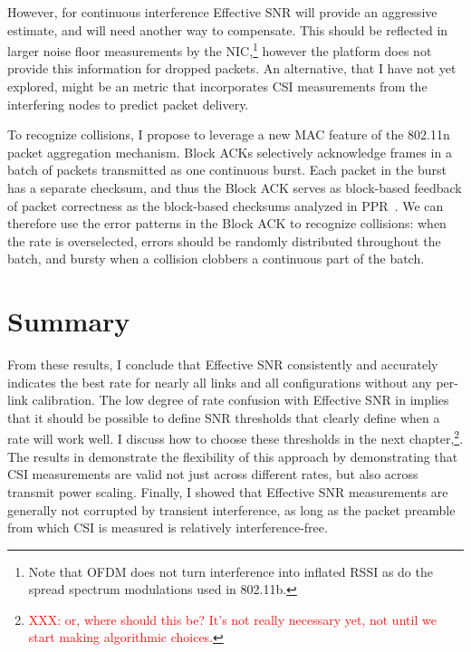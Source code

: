 However, for continuous interference Effective SNR will provide an aggressive estimate, and will need another way to compensate. This should be reflected in larger noise floor measurements by the NIC,\footnote{Note that OFDM does not turn interference into inflated RSSI as do the spread spectrum modulations used in 802.11b.} however the platform does not provide this information for dropped packets. An alternative, that I have not yet explored, might be an  metric that incorporates CSI measurements from the interfering nodes to predict packet delivery.


To recognize collisions, I propose to leverage a new MAC feature of the 802.11n packet aggregation mechanism. Block ACKs selectively acknowledge frames in a batch of packets transmitted as one continuous burst. Each packet in the burst has a separate checksum, and thus the Block ACK serves as block-based feedback of packet correctness as the block-based checksums analyzed in PPR~\cite{Jamieson_PPR}. We can therefore use the error patterns in the Block ACK to recognize collisions: when the rate is overselected, errors should be randomly distributed throughout the batch, and bursty when a collision clobbers a continuous part of the batch.

\section{Summary}
From these results, I conclude that Effective SNR consistently and accurately indicates the best rate for nearly all links and all configurations without any per-link calibration. The low degree of rate confusion with Effective SNR in  implies that it should be possible to define SNR thresholds that clearly define when a rate will work well. I discuss how to choose these thresholds in the next chapter,\footnote{\textcolor{red}{XXX: or, where should this be? It's not really necessary yet, not until we start making algorithmic choices.}}. The results in  demonstrate the flexibility of this approach by demonstrating that CSI measurements are valid not just across different rates, but also across transmit power scaling. Finally, I showed that Effective SNR measurements are generally not corrupted by transient interference, as long as the packet preamble from which CSI is measured is relatively interference-free.

